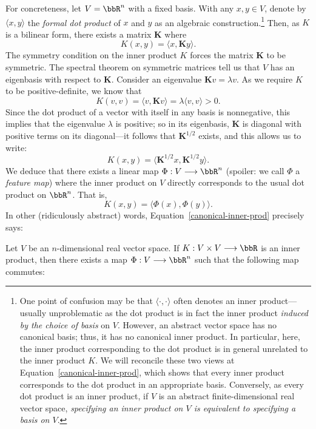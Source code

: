 \documentclass[twoside,11pt]{homework}
\renewcommand{\to}{\longrightarrow}
\begin{document}
\begin{multicols}{2}
For concreteness, let $V = \bbR^n$ with a fixed basis. With any $x,y \in V$, denote by $\langle x,y\rangle$ the \emph{formal dot product} of $x$ and $y$ as an algebraic construction.\footnote{One point of confusion may be that $\langle \cdot,\cdot \rangle$ often denotes an inner product---usually unproblematic as the dot product is in fact the inner product \emph{induced by the choice of basis} on $V$. However, an abstract vector space has no canonical basis; thus, it has no canonical inner product. In particular, here, the inner product corresponding to the dot product is in general unrelated to the inner product $K$. We will reconcile these two views at Equation~\ref{canonical-inner-prod}, which shows that every inner product corresponds to the dot product in an appropriate basis. Conversely, as every dot product is an inner product, if $V$ is an abstract finite-dimensional real vector space, \emph{specifying an inner product on $V$ is equivalent to specifying a basis on $V$}.} Then, as $K$ is a bilinear form, there exists a matrix $\mathbf{K}$ where
\begin{equation}\label{kernel-history}
  K(x,y) = \langle x, \mathbf{K}y\rangle.
\end{equation}
The symmetry condition on the inner product $K$ forces the matrix $\mathbf{K}$ to be symmetric. The spectral theorem on symmetric matrices tell us that $V$ has an eigenbasis with respect to $\mathbf{K}$. Consider an eigenvalue $\mathbf{K} v = \lambda v$. As we require $K$ to be positive-definite, we know that
\[K(v,v) = \langle v, \mathbf{K}v\rangle = \lambda \langle v,v\rangle> 0.\]
Since the dot product of a vector with itself in any basis is nonnegative, this implies that the eigenvalue $\lambda$ is positive; so in its eigenbasis, $\mathbf{K}$ is diagonal with positive terms on its diagonal---it follows that $\mathbf{K}^{1/2}$ exists, and this allows us to write:
\[K(x,y) = \langle \mathbf{K}^{1/2} x, \mathbf{K}^{1/2}y\rangle.\]
We deduce that there exists a linear map $\Phi: V \to \bbR^n$ (spoiler: we call $\Phi$ a \emph{feature map}) where the inner product on $V$ directly corresponds to the usual dot product on $\bbR^n$. That is,
\begin{equation}\label{canonical-inner-prod}
  K(x,y) = \langle \Phi(x), \Phi(y)\rangle.
\end{equation}
In other (ridiculously abstract) words, Equation~\ref{canonical-inner-prod} precisely says:
\begin{proposition}\label{finite-IP}
  Let $V$ be an $n$-dimensional real vector space. If $K : V \times V \to \bbR$ is an inner product, then there exists a map $\Phi: V \to \bbR^n$ such that the following map commutes:

\end{proposition}
\end{multicols}
\end{document}
